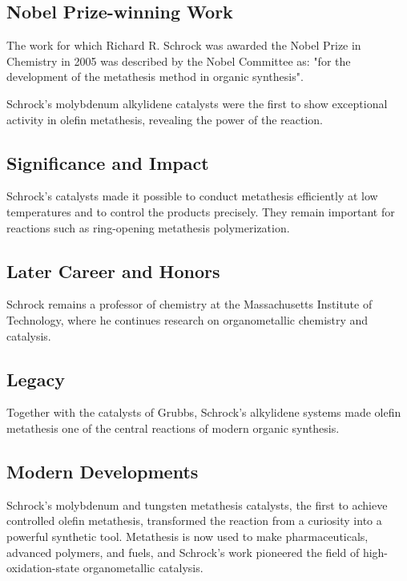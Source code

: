 \subsection*{Nobel Prize-winning Work}

The work for which Richard R. Schrock was awarded the Nobel Prize in Chemistry in 2005 was described by the Nobel Committee as: "for the development of the metathesis method in organic synthesis".

Schrock's molybdenum alkylidene catalysts were the first to show exceptional activity in olefin metathesis, revealing the power of the reaction.

\subsection*{Significance and Impact}

Schrock's catalysts made it possible to conduct metathesis efficiently at low temperatures and to control the products precisely. They remain important for reactions such as ring-opening metathesis polymerization.

\subsection*{Later Career and Honors}

Schrock remains a professor of chemistry at the Massachusetts Institute of Technology, where he continues research on organometallic chemistry and catalysis.

\subsection*{Legacy}

Together with the catalysts of Grubbs, Schrock's alkylidene systems made olefin metathesis one of the central reactions of modern organic synthesis.

\subsection*{Modern Developments}

Schrock's molybdenum and tungsten metathesis catalysts, the first to achieve controlled olefin metathesis, transformed the reaction from a curiosity into a powerful synthetic tool. Metathesis is now used to make pharmaceuticals, advanced polymers, and fuels, and Schrock's work pioneered the field of high-oxidation-state organometallic catalysis.

